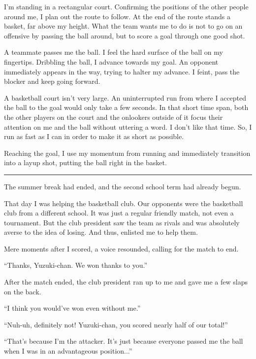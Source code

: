 

I'm standing in a rectangular court. Confirming the positions of the other people around me, I plan out the route to follow. At the end of the route stands a basket, far above my height. What the team wants me to do is not to go on an offensive by passing the ball around, but to score a goal through one good shot.

A teammate passes me the ball. I feel the hard surface of the ball on my fingertips. Dribbling the ball, I advance towards my goal. An opponent immediately appears in the way, trying to halter my advance. I feint, pass the blocker and keep going forward.

A basketball court isn't very large. An uninterrupted run from where I accepted the ball to the goal would only take a few seconds. In that short time span, both the other players on the court and the onlookers outside of it focus their attention on me and the ball without uttering a word. I don't like that time. So, I run as fast as I can in order to make it as short as possible.

Reaching the goal, I use my momentum from running and immediately transition into a layup shot, putting the ball right in the basket.

\vspace{\baselineskip}
\hrule
\vspace{\baselineskip}

The summer break had ended, and the second school term had already begun.

That day I was helping the basketball club. Our opponents were the basketball club from a different school. It was just a regular friendly match, not even a tournament. But the club president saw the team as rivals and was absolutely averse to the idea of losing. And thus, enlisted me to help them.

Mere moments after I scored, a voice resounded, calling for the match to end.

``Thanks, Yuzuki-chan. We won thanks to you.''

After the match ended, the club president ran up to me and gave me a few slaps on the back.

``I think you would've won even without me.''

``Nuh-uh, definitely not! Yuzuki-chan, you scored nearly half of our total!''

``That's because I'm the attacker. It's just because everyone passed me the ball when I was in an advantageous position...''

